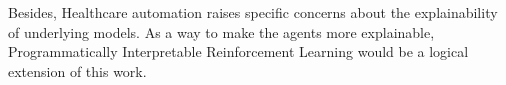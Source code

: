Besides, Healthcare automation raises specific concerns \cite{health-ai-explainability1,health-ai-explainability2} about the explainability of underlying models. 
As a way to make the agents more explainable, Programmatically Interpretable Reinforcement Learning would be a logical extension of this work.
